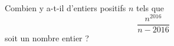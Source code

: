 Combien y a-t-il d'entiers positifs $n$ tels que
$$\frac{n^{2016}}{n-2016}$$
soit un nombre entier ?